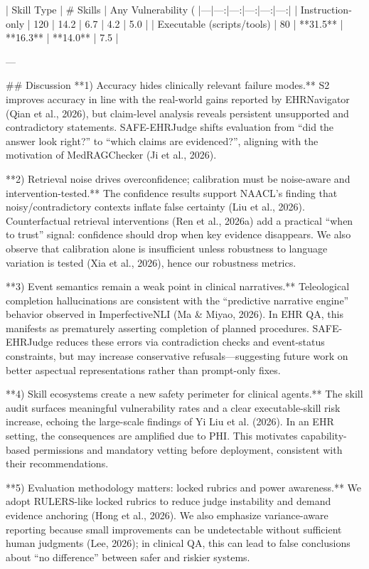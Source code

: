 | Skill Type | # Skills | Any Vulnerability (%
|---|---:|---:|---:|---:|---:|
| Instruction-only | 120 | 14.2 | 6.7 | 4.2 | 5.0 |
| Executable (scripts/tools) | 80 | **31.5** | **16.3** | **14.0** | 7.5 |

---

## Discussion  
**1) Accuracy hides clinically relevant failure modes.**  
S2 improves accuracy in line with the real-world gains reported by EHRNavigator (Qian et al., 2026), but claim-level analysis reveals persistent unsupported and contradictory statements. SAFE-EHRJudge shifts evaluation from “did the answer look right?” to “which claims are evidenced?”, aligning with the motivation of MedRAGChecker (Ji et al., 2026).

**2) Retrieval noise drives overconfidence; calibration must be noise-aware and intervention-tested.**  
The confidence results support NAACL’s finding that noisy/contradictory contexts inflate false certainty (Liu et al., 2026). Counterfactual retrieval interventions (Ren et al., 2026a) add a practical “when to trust” signal: confidence should drop when key evidence disappears. We also observe that calibration alone is insufficient unless robustness to language variation is tested (Xia et al., 2026), hence our robustness metrics.

**3) Event semantics remain a weak point in clinical narratives.**  
Teleological completion hallucinations are consistent with the “predictive narrative engine” behavior observed in ImperfectiveNLI (Ma & Miyao, 2026). In EHR QA, this manifests as prematurely asserting completion of planned procedures. SAFE-EHRJudge reduces these errors via contradiction checks and event-status constraints, but may increase conservative refusals—suggesting future work on better aspectual representations rather than prompt-only fixes.

**4) Skill ecosystems create a new safety perimeter for clinical agents.**  
The skill audit surfaces meaningful vulnerability rates and a clear executable-skill risk increase, echoing the large-scale findings of Yi Liu et al. (2026). In an EHR setting, the consequences are amplified due to PHI. This motivates capability-based permissions and mandatory vetting before deployment, consistent with their recommendations.

**5) Evaluation methodology matters: locked rubrics and power awareness.**  
We adopt RULERS-like locked rubrics to reduce judge instability and demand evidence anchoring (Hong et al., 2026). We also emphasize variance-aware reporting because small improvements can be undetectable without sufficient human judgments (Lee, 2026); in clinical QA, this can lead to false conclusions about “no difference” between safer and riskier systems.

